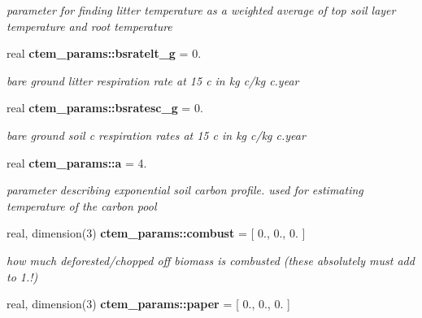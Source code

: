\begin{DoxyCompactItemize}
\begin{DoxyCompactList}\small\item\em parameter for finding litter temperature as a weighted average of top soil layer temperature and root temperature \end{DoxyCompactList}\item 
\hypertarget{namespacectem__params_af429d00148e673d58d18e9d3a419ee66}{}real {\bfseries ctem\+\_\+params\+::bsratelt\+\_\+g} = 0.\label{namespacectem__params_af429d00148e673d58d18e9d3a419ee66}

\begin{DoxyCompactList}\small\item\em bare ground litter respiration rate at 15 c in kg c/kg c.\+year \end{DoxyCompactList}\item 
\hypertarget{namespacectem__params_a3b130e3b7506998094c8650ea4d26ff7}{}real {\bfseries ctem\+\_\+params\+::bsratesc\+\_\+g} = 0.\label{namespacectem__params_a3b130e3b7506998094c8650ea4d26ff7}

\begin{DoxyCompactList}\small\item\em bare ground soil c respiration rates at 15 c in kg c/kg c.\+year \end{DoxyCompactList}\item 
\hypertarget{namespacectem__params_a8822a85e4e8060308fbdb71f7983e926}{}real {\bfseries ctem\+\_\+params\+::a} = 4.\label{namespacectem__params_a8822a85e4e8060308fbdb71f7983e926}

\begin{DoxyCompactList}\small\item\em parameter describing exponential soil carbon profile. used for estimating temperature of the carbon pool \end{DoxyCompactList}\item 
\hypertarget{namespacectem__params_aa754be19830b01b24a5a992122c67f6f}{}real, dimension(3) {\bfseries ctem\+\_\+params\+::combust} = \mbox{[} 0., 0., 0. \mbox{]}\label{namespacectem__params_aa754be19830b01b24a5a992122c67f6f}

\begin{DoxyCompactList}\small\item\em how much deforested/chopped off biomass is combusted (these absolutely must add to 1.!) \end{DoxyCompactList}\item 
\hypertarget{namespacectem__params_a39b15413313f38228e1c02dbd0d672f3}{}real, dimension(3) {\bfseries ctem\+\_\+params\+::paper} = \mbox{[} 0., 0., 0. \mbox{]}\label{namespacectem__params_a39b15413313f38228e1c02dbd0d672f3}


\end{DoxyCompactItemize}
